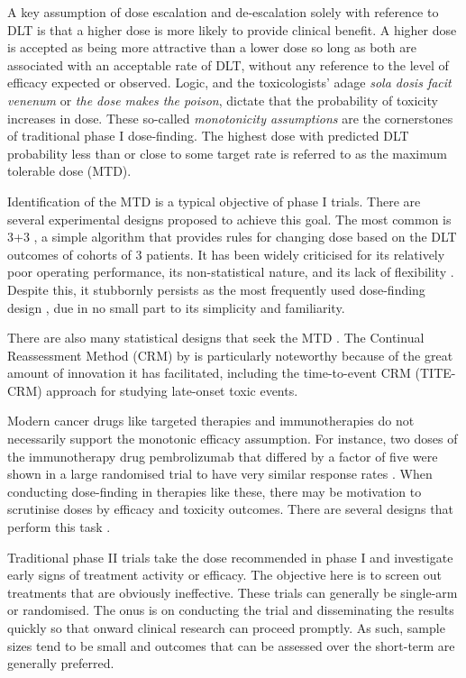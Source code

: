 \documentclass[article]{jss}
\begin{document}
A key assumption of dose escalation and de-escalation solely with
reference to DLT is that a higher dose is more likely to provide
clinical benefit. A higher dose is accepted as being more attractive
than a lower dose so long as both are associated with an acceptable rate
of DLT, without any reference to the level of efficacy expected or
observed. Logic, and the toxicologists' adage
\textit{sola dosis facit venenum} or \textit{the dose makes the poison},
dictate that the probability of toxicity increases in dose. These
so-called \textit{monotonicity assumptions} are the cornerstones of
traditional phase I dose-finding. The highest dose with predicted DLT
probability less than or close to some target rate is referred to as the
maximum tolerable dose (MTD).

Identification of the MTD is a typical objective of phase I trials.
There are several experimental designs proposed to achieve this goal.
The most common is 3+3 \citep{carterStudyDesignPrinciples1973}, a simple
algorithm that provides rules for changing dose based on the DLT
outcomes of cohorts of 3 patients. It has been widely criticised for its
relatively poor operating performance, its non-statistical nature, and
its lack of flexibility
\citep{OQuigley1990, oquigleyExperimentalDesignsPhase2006, Iasonos2008, LeTourneau2009}.
Despite this, it stubbornly persists as the most frequently used
dose-finding design \citep{Rogatko2007, Chiuzan2017}, due in no small
part to its simplicity and familiarity.

There are also many statistical designs that seek the MTD
\citep[amongst others]{OQuigley1990, Tighiouart2010, Ji2013a}. The
Continual Reassessment Method (CRM) by \cite{OQuigley1990} is
particularly noteworthy because of the great amount of innovation it has
facilitated, including the time-to-event CRM (TITE-CRM) approach
\citep{Cheung2000} for studying late-onset toxic events.

Modern cancer drugs like targeted therapies and immunotherapies do not
necessarily support the monotonic efficacy assumption. For instance, two
doses of the immunotherapy drug pembrolizumab that differed by a factor
of five were shown in a large randomised trial to have very similar
response rates \citep{Herbst2016}. When conducting dose-finding in
therapies like these, there may be motivation to scrutinise doses by
efficacy and toxicity outcomes. There are several designs that perform
this task \citep{Braun2002, Thall2004, Zhang2006, Wages2014}.

Traditional phase II trials take the dose recommended in phase I and
investigate early signs of treatment activity or efficacy. The objective
here is to screen out treatments that are obviously ineffective. These
trials can generally be single-arm or randomised. The onus is on
conducting the trial and disseminating the results quickly so that
onward clinical research can proceed promptly. As such, sample sizes
tend to be small and outcomes that can be assessed over the short-term
are generally preferred.
\end{document}
